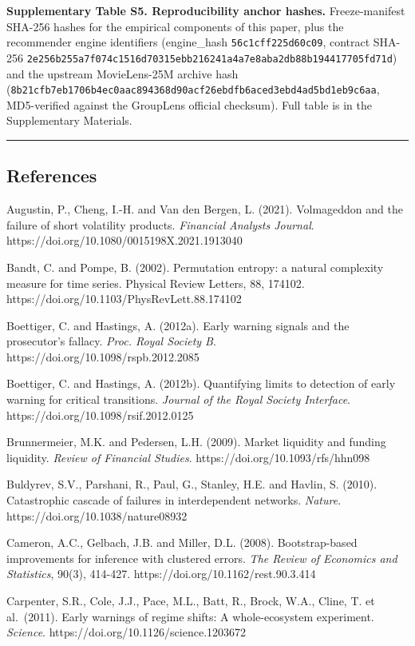 \documentclass[
  11pt,
]{article}
\begin{document}
\textbf{Supplementary Table S5. Reproducibility anchor hashes.}
Freeze-manifest SHA-256 hashes for the empirical components of this
paper, plus the recommender engine identifiers (engine\_hash
\texttt{56c1cff225d60c09}, contract SHA-256
\texttt{2e256b255a7f074c1516d70315ebb216241a4a7e8aba2db88b194417705fd71d})
and the upstream MovieLens-25M archive hash
(\texttt{8b21cfb7eb1706b4ec0aac894368d90acf26ebdfb6aced3ebd4ad5bd1eb9c6aa},
MD5-verified against the GroupLens official checksum). Full table is in
the Supplementary Materials.

\begin{center}\rule{0.5\linewidth}{0.5pt}\end{center}

\subsection{References}\label{references}

Augustin, P., Cheng, I.-H. and Van den Bergen, L. (2021). Volmageddon
and the failure of short volatility products. \emph{Financial Analysts
Journal}. https://doi.org/10.1080/0015198X.2021.1913040

Bandt, C. and Pompe, B. (2002). Permutation entropy: a natural
complexity measure for time series. Physical Review Letters, 88, 174102.
https://doi.org/10.1103/PhysRevLett.88.174102

Boettiger, C. and Hastings, A. (2012a). Early warning signals and the
prosecutor's fallacy. \emph{Proc. Royal Society B}.
https://doi.org/10.1098/rspb.2012.2085

Boettiger, C. and Hastings, A. (2012b). Quantifying limits to detection
of early warning for critical transitions. \emph{Journal of the Royal
Society Interface}. https://doi.org/10.1098/rsif.2012.0125

Brunnermeier, M.K. and Pedersen, L.H. (2009). Market liquidity and
funding liquidity. \emph{Review of Financial Studies}.
https://doi.org/10.1093/rfs/hhn098

Buldyrev, S.V., Parshani, R., Paul, G., Stanley, H.E. and Havlin, S.
(2010). Catastrophic cascade of failures in interdependent networks.
\emph{Nature}. https://doi.org/10.1038/nature08932

Cameron, A.C., Gelbach, J.B. and Miller, D.L. (2008). Bootstrap-based
improvements for inference with clustered errors. \emph{The Review of
Economics and Statistics}, 90(3), 414-427.
https://doi.org/10.1162/rest.90.3.414

Carpenter, S.R., Cole, J.J., Pace, M.L., Batt, R., Brock, W.A., Cline,
T. et al.~(2011). Early warnings of regime shifts: A whole-ecosystem
experiment. \emph{Science}. https://doi.org/10.1126/science.1203672
\end{document}
